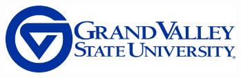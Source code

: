\documentclass[
  12pt,
  letterpaper,
]{scrartcl}
\begin{document}
\begin{titlepage}
\newcommand{\titlepagefooterblock}{
\footerstyled
}

\newcommand{\titlepagedateblock}{
\datestyled
}

\newcommand{\titleblock}{\newlength{\betweentitlesubtitle}
\setlength{\betweentitlesubtitle}{\baselineskip}
{

{\titlepagetitleblock}
}

\vspace{1.5cm}
}

\newcommand{\authorblock}{{\titlepageauthorblock}

\vspace{1.5cm}
}

\newcommand{\affiliationblock}{{\titlepageaffiliationblock}

\vspace{0pt}
}

\newcommand{\logoblock}{{\includegraphics[width=250pt]{gvlogo.png}}

\vspace{2\baselineskip}
}

\newcommand{\footerblock}{}

\newcommand{\dateblock}{{\titlepagedateblock}

\vspace{0pt}
}

\newcommand{\headerblock}{}

\thispagestyle{empty} %


\newlength{\minipagewidth}
\setlength{\minipagewidth}{\textwidth}
\raggedright %
\begin{minipage}[b][\textheight][s]{\minipagewidth}
\titlepagepagealign
\headerblock

\logoblock

\titleblock

\authorblock
\par

\end{minipage}
\clearpage
\end{titlepage}
\setcounter{page}{1}
\end{document}
